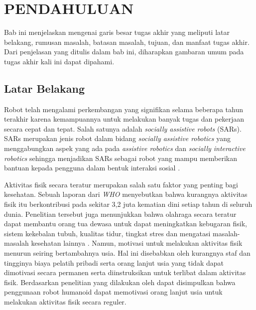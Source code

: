 \chapter{PENDAHULUAN}
\label{chap:pendahuluan}

Bab ini menjelaskan mengenai garis besar tugas akhir yang meliputi latar belakang, 
rumusan masalah, batasan masalah, tujuan, dan manfaat tugas akhir. Dari penjelasan yang 
ditulis dalam bab ini, diharapkan gambaran umum pada tugas akhir kali ini dapat dipahami.

\section{Latar Belakang}
\label{sec:latar-belakang}

Robot telah mengalami perkembangan yang signifikan selama beberapa tahun terakhir karena kemampuannya untuk melakukan banyak tugas dan pekerjaan secara cepat dan tepat. Salah satunya adalah \emph{socially assistive robots} (SARs). SARs merupakan jenis robot dalam bidang \emph{socially assistive robotics} yang menggabungkan aspek yang ada pada \emph{assistive robotics} dan \emph{socially interactive robotics} sehingga menjadikan SARs sebagai robot yang mampu memberikan bantuan kepada pengguna dalam bentuk interaksi sosial \parencite{feil2005}.

Aktivitas fisik secara teratur merupakan salah satu faktor yang penting bagi kesehatan. Sebuah laporan dari \emph{WHO} menyebutkan bahwa kurangnya aktivitas fisik itu berkontribusi pada sekitar 3,2 juta kematian dini setiap tahun di seluruh dunia.
Penelitian tersebut juga menunjukkan bahwa olahraga secara teratur dapat membantu orang tua dewasa untuk dapat meningkatkan kebugaran fisik, sistem kekebalan tubuh, kualitas tidur, tingkat stres dan mengatasi masalah-masalah kesehatan lainnya \parencite{lotfi2018}. Namun, motivasi untuk melakukan aktivitas fisik menurun seiring bertambahnya usia. Hal ini disebabkan oleh kurangnya staf dan tingginya biaya pelatih pribadi serta orang lanjut usia yang tidak dapat dimotivasi secara permanen serta diinstruksikan untuk terlibat dalam aktivitas fisik. Berdasarkan penelitian yang dilakukan oleh \parencite{ruf2020} dapat disimpulkan bahwa penggunaan robot humanoid dapat memotivasi orang lanjut usia untuk melakukan aktivitas fisik secara reguler.

